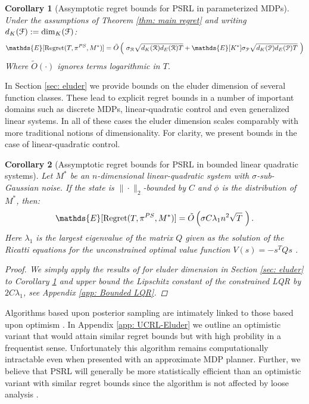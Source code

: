 \documentclass{article}
\newtheorem{corollary}{Corollary}
\newcommand{\Exp}{\mathds{E}}
\newcommand{\Pc}{\mathcal{P}}
\newcommand{\Fc}{\mathcal{F}}
\newcommand{\Rc}{\mathcal{R}}
\begin{document}
\begin{corollary}[Assymptotic regret bounds for PSRL in parameterized MDPs]
\label{cor: ass regret} \hspace{0.00000000000001mm} \newline
Under the assumptions of Theorem \ref{thm: main regret} and writing $d_K(\Fc) := {\rm dim}_K(\Fc)$:
\begin{equation}
	\Exp[{\rm Regret}(T,\pi^{PS},M^*)] = \tilde{O} \left( \ \sigma_\Rc \sqrt{d_K(\Rc) d_E(\Rc) T}
		+ \Exp[K^*] \sigma_\Pc \sqrt{d_K(\Pc) d_E(\Pc) T} \ \right)
\end{equation}
Where $\tilde{O}(\cdot)$ ignores terms logarithmic in $T$.
\end{corollary}

In Section \ref{sec: eluder} we provide bounds on the eluder dimension of several function classes.
These lead to explicit regret bounds in a number of important domains such as discrete MDPs, linear-quadratic control and even generalized linear systems.
In all of these cases the eluder dimension scales comparably with more traditional notions of dimensionality.
For clarity, we present bounds in the case of linear-quadratic control.

\begin{corollary}[Assymptotic regret bounds for PSRL in bounded linear quadratic systems]
\label{cor: LQR} \hspace{0.00000000000001mm} \newline
Let $M^*$ be an $n$-dimensional linear-quadratic system with $\sigma$-sub-Gaussian noise.
If the state is $\| \cdot \|_2$-bounded by $C$ and $\phi$ is the distribution of $M^*$, then:
\begin{equation}
	\Exp[{\rm Regret}(T,\pi^{PS},M^*)] = \tilde{O} \left( \sigma C \lambda_1 n^2 \sqrt{T} \ \right).
\end{equation}
Here $\lambda_1$ is the largest eigenvalue of the matrix $Q$ given as the solution of the Ricatti equations for the unconstrained optimal value function $V(s) = -s^T Q s$ \cite{bertsekas1995dynamic}.
\begin{proof}
We simply apply the results of for eluder dimension in Section \ref{sec: eluder} to Corollary \ref{cor: ass regret} and upper bound the Lipschitz constant of the constrained LQR by $2 C \lambda_1$, see Appendix \ref{app: Bounded LQR}.
\end{proof}
\end{corollary}

Algorithms based upon posterior sampling are intimately linked to those based upon optimism \cite{russo2013}.
In Appendix \ref{app: UCRL-Eluder} we outline an optimistic variant that would attain similar regret bounds but with high probility in a frequentist sense.
Unfortunately this algorithm remains computationally intractable even when presented with an approximate MDP planner.
Further, we believe that PSRL will generally be more statistically efficient than an optimistic variant with similar regret bounds since the algorithm is not affected by loose analysis \cite{osband2013more}.
\end{document}
